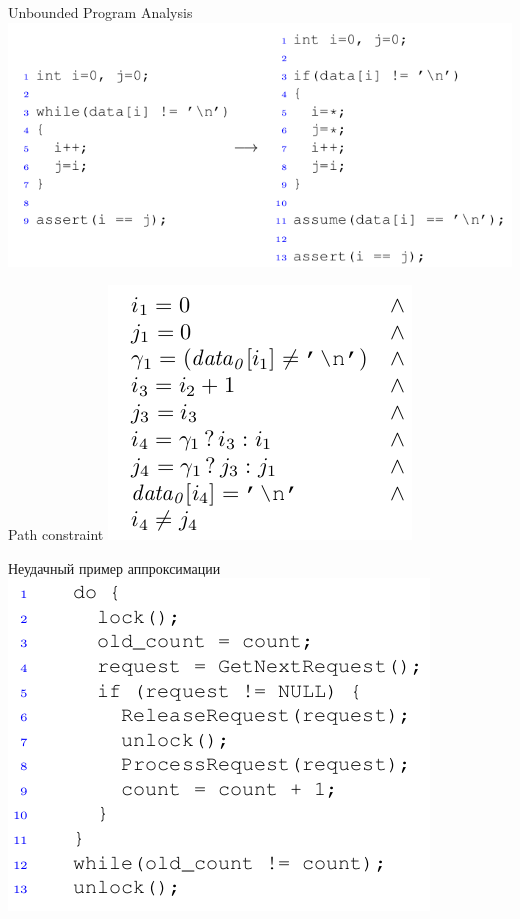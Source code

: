 \documentclass{beamer}
\begin{document}
\begin{frame}{Unbounded Program Analysis}
\includegraphics[scale=0.5]{unbounded_program_analysis.png}
\end{frame}

\begin{frame}{Path constraint}
\includegraphics[scale=0.5]{path_constraint3.png}
\end{frame}

\begin{frame}{Неудачный пример аппроксимации}
\includegraphics[scale=0.5]{example3.png}
\end{frame}
\end{document}
